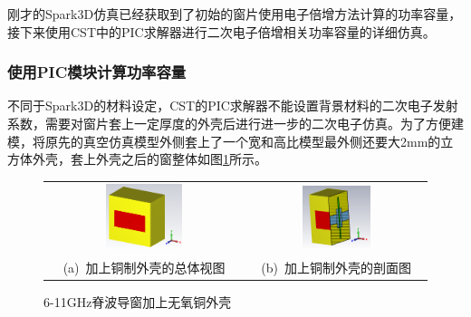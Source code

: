 \documentclass[master]{thesis-uestc}
\begin{document}
刚才的Spark3D仿真已经获取到了初始的窗片使用电子倍增方法计算的功率容量，接下来使用CST中的PIC求解器进行二次电子倍增相关功率容量的详细仿真。

\subsubsection{使用PIC模块计算功率容量}
不同于Spark3D的材料设定，CST的PIC求解器不能设置背景材料的二次电子发射系数，需要对窗片套上一定厚度的外壳后进行进一步的二次电子仿真。为了方便建模，将原先的真空仿真模型外侧套上了一个宽和高比模型最外侧还要大2mm的立方体外壳，套上外壳之后的窗整体如图\ref{fig:X无氧铜外壳}所示。


\begin{figure}[!htb]
    \small
    \centering
    \begin{tabular}{@{\ }c@{\ }c}
        \includegraphics[width=0.4\textwidth]{pic/chapter3/X脊波导窗无氧铜外壳.png} & 
        \hspace{5pt}
        \includegraphics[width=0.4\textwidth]{pic/chapter3/X铜制外壳剖面图.png}     \\
        \mbox{\small (a) 加上铜制外壳的总体视图}                                                                               & 
        \mbox{\small (b) 加上铜制外壳的剖面图}                                                                                  \\
    \end{tabular}
    \caption{6-11GHz脊波导窗加上无氧铜外壳}
    \label{fig:X无氧铜外壳}
\end{figure}
\end{document}
